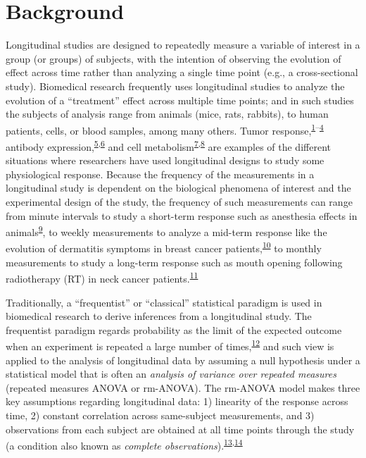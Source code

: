 \documentclass[
]{article}
\begin{document}
\hypertarget{background}{%
\section{Background}\label{background}}

Longitudinal studies are designed to repeatedly measure a variable of interest in a group (or groups) of subjects, with the intention of observing the evolution of effect across time rather than analyzing a single time point (e.g., a cross-sectional study). Biomedical research frequently uses longitudinal studies to analyze the evolution of a ``treatment'' effect across multiple time points; and in such studies the subjects of analysis range from animals (mice, rats, rabbits), to human patients, cells, or blood samples, among many others. Tumor response,\textsuperscript{\protect\hyperlink{ref-roblyer2011}{1}--\protect\hyperlink{ref-demidov2018}{4}} antibody expression,\textsuperscript{\protect\hyperlink{ref-ritter2001}{5},\protect\hyperlink{ref-roth2017}{6}} and cell metabolism\textsuperscript{\protect\hyperlink{ref-jones2018}{7},\protect\hyperlink{ref-skala2010}{8}} are examples of the different situations where researchers have used longitudinal designs to study some physiological response. Because the frequency of the measurements in a longitudinal study is dependent on the biological phenomena of interest and the experimental design of the study, the frequency of such measurements can range from minute intervals to study a short-term response such as anesthesia effects in animals\textsuperscript{\protect\hyperlink{ref-greening2018}{9}}, to weekly measurements to analyze a mid-term response like the evolution of dermatitis symptoms in breast cancer patients,\textsuperscript{\protect\hyperlink{ref-sio2016}{10}} to monthly measurements to study a long-term response such as mouth opening following radiotherapy (RT) in neck cancer patients.\textsuperscript{\protect\hyperlink{ref-kamstra2015}{11}}

Traditionally, a ``frequentist'' or ``classical'' statistical paradigm is used in biomedical research to derive inferences from a longitudinal study. The frequentist paradigm regards probability as the limit of the expected outcome when an experiment is repeated a large number of times,\textsuperscript{\protect\hyperlink{ref-wagenmakers2008}{12}} and such view is applied to the analysis of longitudinal data by assuming a null hypothesis under a statistical model that is often an \emph{analysis of variance over repeated measures} (repeated measures ANOVA or rm-ANOVA). The rm-ANOVA model makes three key assumptions regarding longitudinal data: 1) linearity of the response across time, 2) constant correlation across same-subject measurements, and 3) observations from each subject are obtained at all time points through the study (a condition also known as \emph{complete observations}).\textsuperscript{\protect\hyperlink{ref-gueorguieva2004}{13},\protect\hyperlink{ref-schober2018}{14}}
\end{document}
